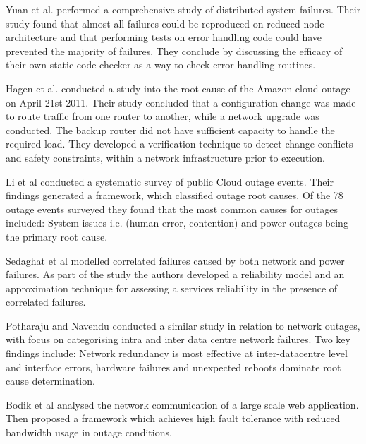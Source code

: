 \documentclass[5p]{elsarticle}
\begin{document}
Yuan et al. \cite{yuan2014simple} performed a comprehensive study of distributed system failures. Their study found that almost all failures could be reproduced on reduced node architecture and that performing tests on error handling code could have prevented the majority of failures. They conclude by discussing the efficacy of their own static code checker as a way to check error-handling routines. \par

Hagen et al. \cite{hagen2012efficient} conducted a study into the root cause of the Amazon cloud outage on April 21st 2011. Their study concluded that a configuration change was made to route traffic from one router to another, while a network upgrade was conducted. The backup router did not have sufficient capacity to handle the required load. They developed a verification technique to detect change conflicts and safety constraints, within a network infrastructure prior to execution. \par

Li et al \cite{li2013cloud} conducted a systematic survey of public Cloud outage events. Their findings generated a  framework, which classified outage root causes. Of the 78 outage events surveyed they found that the most common causes for outages included: System issues i.e. (human error, contention) and power outages being the primary root cause. \par

Sedaghat et al \cite{sedaghat2015hard} modelled correlated failures caused by both network and power failures. As part of the study the authors developed a reliability model and an approximation technique for assessing a services reliability in the presence of correlated failures. \par 

Potharaju and Navendu \cite{potharaju2013network} conducted a similar study in relation to network outages, with focus on categorising intra and inter data centre network failures. Two key findings include: Network redundancy is most effective at inter-datacentre level and interface errors, hardware failures and unexpected reboots dominate root cause determination. \par

Bodik et al \cite{bodik2012surviving} analysed the network communication of a large scale web application. Then proposed a framework which achieves high fault tolerance with reduced bandwidth usage in outage conditions. \par 
\end{document}
